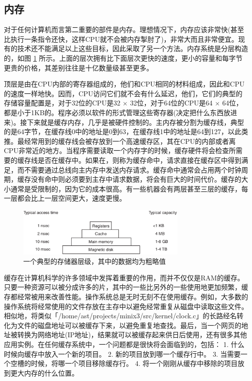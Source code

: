 \subsection{内存}

	对于任何计算机而言第二重要的部件是内存。理想情况下，内存应该非常快(甚至比执行一条指令还快，这样CPU就不会被内存掣肘了)，非常大而且非常便宜。现有的技术还不能满足以上这些目标，因此采取了另一个方法。内存系统是分层构造的，如图 \ref{fig:memoryhierarchy} 所示。上面的层次拥有比下面层次更快的速度，更小的容量和每字节更贵的价格，其差别往往是十亿数量级甚至更多。
	
	顶层是由在CPU内部的寄存器组成的，他们和CPU相同的材料组成，因此和CPU的速度一样地快。因而，CPU访问它们就不会有什么延迟，他们，它们的典型的存储容量配置是，对于32位的CPU是32 $\times$ 32位，对于64位的CPU是64 $\times$ 64位，都是小于1KB的。程序必须以软件的形式管理这些寄存器(决定把什么东西放进来)。接下来就是缓存内存，几乎是被硬件控制的。主内存被分割为缓存线，典型的是64字节，在缓存线0中的地址是0到63，在缓存线1中的地址是64到127，以此类推。最经常用到的缓存线会被存放到一个高速缓存区，其在CPU的内部或者离CPU非常近的地方。当程序需要读取一个内存字的时候，缓存硬件将会检查所需要的缓存线是否在缓存中。如果在，则称为缓存命中，请求直接在缓存区中得到满足，而不需要通过总线向主内存中发送内存请求。缓存命中通常会占用两个时钟周期，缓存没有命中则必须要到主存中请求数据，将会有巨大的时间代价。缓存的大小通常是受限制的，因为它的成本很高。有一些机器会有两层甚至三层的缓存，每一层都会比上一层空间更大，速度更慢。
	
	\begin{figure}[ht]\small
		\centering
		\includegraphics[width=0.75\textwidth]{FIG/1-9.png}
		\caption{一个典型的存储器层级，其中的数据均为粗略值}\label{fig:memoryhierarchy}
	\end{figure}

	缓存在计算机科学的许多领域中发挥着重要的作用，而并不仅仅是RAM的缓存。只要一种资源可以被分成许多的片，其中的一些比另外的一些使用地更加频繁，缓存都经常被用来改善性能。操作系统总是无时无刻不在使用缓存。例如，大多数的操作系统将经常使用的文件存放在主存中以避免经常重复从磁盘中读取这些文件。相似地，将类似「/home/ast/projects/minix3/src/kernel/clock.c」的长路经名转化为文件的磁盘地址可以被缓存下来，以避免重复地查找。最后，当一个网页的地址被转换为网络地址(IP地址)，结果就可以被缓存起来供日后使用，还有很多其他应用实例。在任何缓存系统中，一个问题都是很快将会面临到的，包括：
	1. 什么时候向缓存中放入一个新的项目。 
	2. 新的项目放到哪一个缓存行中。
	3. 当需要一个空槽的时候，将哪一个项目移除缓存行。
	4. 将一个刚刚从缓存中移除的项目放到更大内存的什么位置。
	
